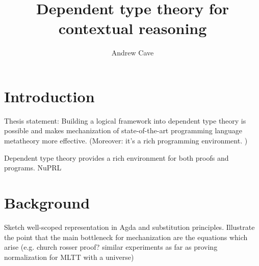 \documentclass{article}
\author{Andrew Cave}
\title{Dependent type theory for contextual reasoning}
\begin{document}
\maketitle

\section{Introduction}
Thesis statement: Building a logical framework into dependent type
theory is possible and makes mechanization of state-of-the-art programming
language metatheory more effective. (Moreover: it's a rich programming
environment. %
)

Dependent type theory provides a rich environment for both proofs and
programs. 
NuPRL \citep{NuPRL}

\section{Background}
Sketch well-scoped representation in Agda and substitution
principles. Illustrate the point that the main bottleneck for
mechanization are the equations which arise (e.g. church rosser proof?
similar experiments as far as proving normalization for MLTT with a universe)
\end{document}
